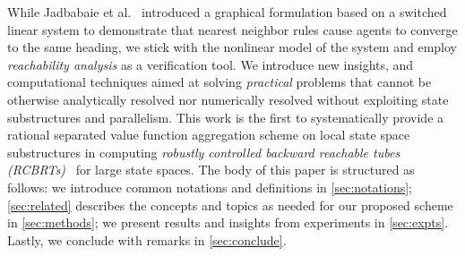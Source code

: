 While Jadbabaie et al.~\cite{JadbabaieCoord} introduced a graphical formulation based on a switched linear system to demonstrate that nearest neighbor rules cause agents to converge to the same heading, we stick with the nonlinear model of the system and employ \textit{reachability analysis} as a verification tool.  We introduce new insights, and computational techniques aimed at solving \textit{practical} problems that cannot be otherwise analytically resolved nor numerically resolved without exploiting state substructures and parallelism. This work is the first to systematically provide a rational separated value function aggregation  scheme on local state space substructures in computing \textit{robustly controlled backward reachable tubes  (RCBRTs)}~\cite{Mitchell2020} for large state spaces. The body of this paper is structured as follows: we introduce common notations and definitions in \autoref{sec:notations}; \autoref{sec:related} describes the concepts and topics as needed for our proposed scheme in \autoref{sec:methods}; we present results and insights from experiments in \autoref{sec:expts}. Lastly, we  conclude with remarks in \autoref{sec:conclude}.  